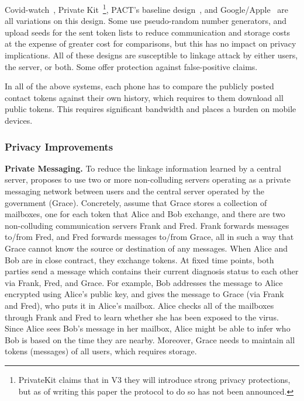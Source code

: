 {	Covid-watch~\cite{Covid-watch}, Private Kit~\cite{PrivateKit}\footnote{PrivateKit claims that in V3 they will introduce strong privacy protections, but as of writing this paper the protocol to do so has not been announced.}, PACT's baseline design~\cite{chan2020pact}, and Google/Apple~\cite{google-apple} are all variations on this design. Some use pseudo-random number generators, and upload seeds for the sent token lists to reduce communication and storage costs at the expense of greater cost for comparisons, but this has no impact on privacy implications. All of these designs are susceptible to linkage attack by either users, the server, or both. Some offer protection against false-positive claims.
	
	In all of the above systems, each phone has to compare the publicly posted contact tokens against their own history, which requires to them download all public tokens. This requires significant bandwidth and places a burden on mobile devices.
	
	\subsubsection{Privacy Improvements}
	
	\textbf{Private Messaging.} To reduce the linkage information learned by a central server, \cite{cho2020contact} proposes to use two or more non-colluding servers operating as a private messaging network between users and the central server operated by the government (Grace). Concretely, assume that Grace stores a collection of mailboxes, one for each token that Alice and Bob exchange, and there are two non-colluding communication servers Frank and Fred. Frank forwards messages to/from Fred, and Fred forwards messages to/from Grace, all in such a way that Grace cannot know the source or destination of any messages. When Alice and Bob are in close contract, they exchange tokens. At fixed time points, both parties send a message which contains their current diagnosis status to each other via Frank, Fred, and Grace. For example, Bob addresses the
	message to Alice encrypted using Alice's public key, and gives the message to Grace (via Frank and Fred), who puts it in Alice's mailbox. Alice checks all of the mailboxes through Frank and Fred to learn whether she has been exposed to the virus. Since Alice sees Bob's message in her mailbox,  Alice might be able to infer who
	Bob is based on the time they are nearby. Moreover, Grace needs to maintain all tokens (messages) of all users, which requires storage.
	
}
